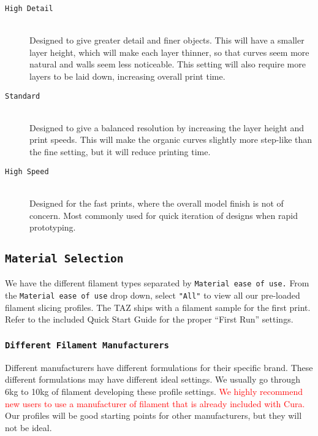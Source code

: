 \begin{description}
\item[\texttt{High Detail}] \hfill \\
Designed to give greater detail and finer objects. This will have a smaller layer height, which will make each layer thinner, so that curves seem more natural and walls seem less noticeable. This setting will also require more layers to be laid down, increasing overall print time.

\item[\texttt{Standard}] \hfill \\
Designed to give a balanced resolution by increasing the layer height and print speeds. This will make the organic curves slightly more step-like than the fine setting, but it will reduce printing time.

\item[\texttt{High Speed}] \hfill \\
Designed for the fast prints, where the overall model finish is not of concern. Most commonly used for quick iteration of designs when rapid prototyping.
\end{description}

\subsection{\texttt{Material Selection}}
We have the different filament types separated by \texttt{Material ease of use.} From the \texttt{Material ease of use} drop down, select \texttt{"All"} to view all our pre-loaded filament slicing profiles. The TAZ ships with a filament sample for the first print. Refer to the included Quick Start Guide for the proper ``First Run'' settings.

\subsubsection{\texttt{Different Filament Manufacturers}}
Different manufacturers have different formulations for their specific brand. These different formulations may have different ideal settings. We usually go through 6kg to 10kg of filament developing these profile settings. \textcolor{red}{We highly recommend new users to use a manufacturer of filament that is already included with Cura.} Our profiles will be good starting points for other manufacturers, but they will not be ideal.

